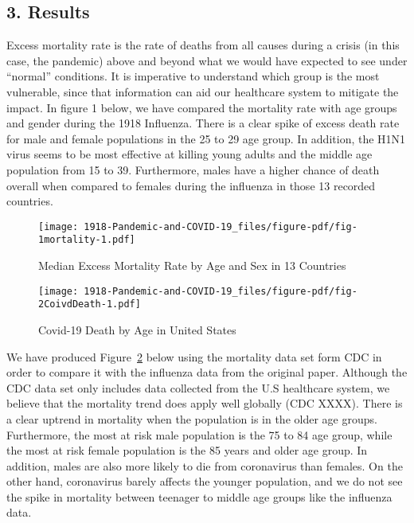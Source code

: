 \documentclass[
]{article}
\begin{document}
\hypertarget{results}{%
\subsection{3. Results}\label{results}}

Excess mortality rate is the rate of deaths from all causes during a
crisis (in this case, the pandemic) above and beyond what we would have
expected to see under ``normal'' conditions. It is imperative to
understand which group is the most vulnerable, since that information
can aid our healthcare system to mitigate the impact. In figure 1 below,
we have compared the mortality rate with age groups and gender during
the 1918 Influenza. There is a clear spike of excess death rate for male
and female populations in the 25 to 29 age group. In addition, the H1N1
virus seems to be most effective at killing young adults and the middle
age population from 15 to 39. Furthermore, males have a higher chance of
death overall when compared to females during the influenza in those 13
recorded countries.

\begin{figure}

{\centering \texttt{[image: 1918-Pandemic-and-COVID-19\_files/figure-pdf/fig-1mortality-1.pdf]}

}

\caption{\label{fig-1mortality}Median Excess Mortality Rate by Age and
Sex in 13 Countries}

\end{figure}

\begin{figure}

{\centering \texttt{[image: 1918-Pandemic-and-COVID-19\_files/figure-pdf/fig-2CoivdDeath-1.pdf]}

}

\caption{\label{fig-2CoivdDeath}Covid-19 Death by Age in United States}

\end{figure}

We have produced Figure~\ref{fig-2CoivdDeath} below using the mortality
data set form CDC in order to compare it with the influenza data from
the original paper. Although the CDC data set only includes data
collected from the U.S healthcare system, we believe that the mortality
trend does apply well globally (CDC XXXX). There is a clear uptrend in
mortality when the population is in the older age groups. Furthermore,
the most at risk male population is the 75 to 84 age group, while the
most at risk female population is the 85 years and older age group. In
addition, males are also more likely to die from coronavirus than
females. On the other hand, coronavirus barely affects the younger
population, and we do not see the spike in mortality between teenager to
middle age groups like the influenza data.
\end{document}
